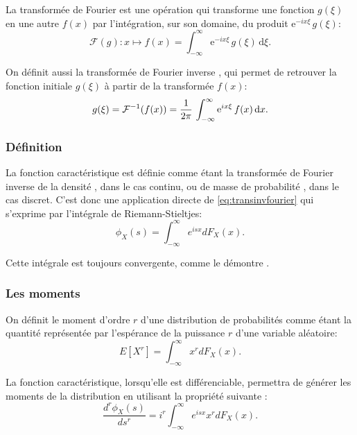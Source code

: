 La transformée de Fourier est une opération qui transforme une
fonction $g(\xi)$ en une autre $f(x)$ par l'intégration, sur son
domaine, du produit $\mathrm{e}^{-i x\xi}\,g(\xi)$:
\begin{equation}
  \label{eq:transfourier}
  \mathcal{F}(g):x\mapsto f(x) = \int_{-\infty}^{\infty} \mathrm{e}^{-ix\xi}\,g(\xi)\,\mathrm{d}\xi.
\end{equation}

On définit aussi la transformée de Fourier inverse
, qui permet de retrouver la
fonction initiale $g(\xi)$ à partir de la transformée $f(x)$:
\begin{equation}
  \label{eq:transinvfourier}
  g(\xi)=\mathcal{F}^{-1}(f(x)) = {1 \over 2\pi}\, \int_{-\infty}^{\infty} \mathrm{e}^{ix \xi}\,f(x)\, \mathrm{d}x.
\end{equation}

\subsubsection{Définition}
\label{sec:deffncaract}

La fonction caractéristique  est
définie comme étant la transformée de Fourier inverse de la densité
, dans le cas continu, ou de masse de
probabilité , dans le cas
discret. C'est donc une application directe de
\eqref{eq:transinvfourier} qui s'exprime par l'intégrale de
Riemann-Stieltjes:
\begin{equation}
  \label{eq:deffncaract}
  \phi_X(s) = \int_{-\infty}^{\infty} e^{isx} dF_X(x).
\end{equation}

Cette intégrale est toujours convergente, comme le démontre
\cite{stuart1987kendall}.

\subsubsection{Les moments}
\label{sec:momentsfncaract}
On définit le moment d'ordre $r$ d'une distribution de probabilités
comme étant la quantité représentée par l'espérance de la puissance
$r$ d'une variable aléatoire:
\begin{equation}
  \label{eq:defmoments}
  E[X^r] = \int_{-\infty}^{\infty} x^r dF_X(x).
\end{equation}

La fonction caractéristique,
lorsqu'elle est différenciable, permettra de générer les moments de la
distribution en utilisant la propriété suivante
\citep{lukacs1960characteristic}:
\begin{equation*}
  \frac{d^r\phi_X(s)}{ds^r} = i^r \int_{-\infty}^{\infty} e^{isx} x^r dF_X(x).
\end{equation*}

